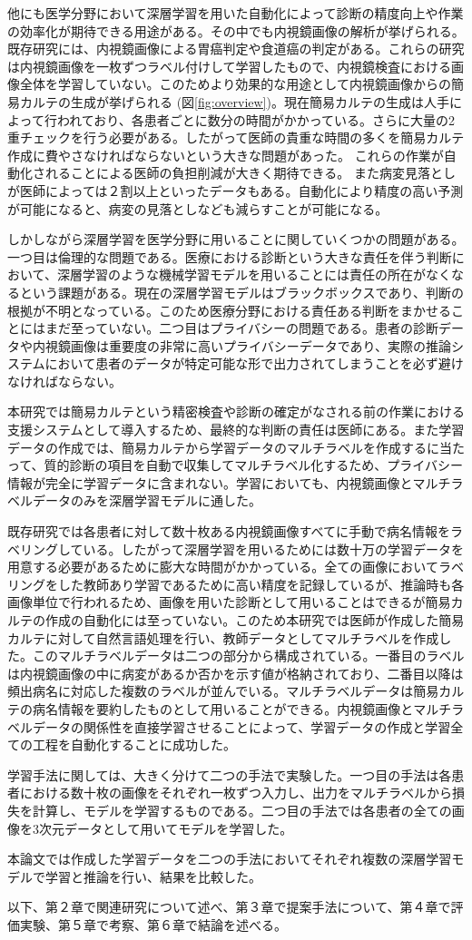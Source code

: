 他にも医学分野において深層学習を用いた自動化によって診断の精度向上や作業の効率化が期待できる用途がある。その中でも内視鏡画像の解析が挙げられる。既存研究には、内視鏡画像による胃癌判定\cite{stomach_cancer}や食道癌\cite{esophageal_cancer}の判定がある。これらの研究は内視鏡画像を一枚ずつラベル付けして学習したもので、内視鏡検査における画像全体を学習していない。このためより効果的な用途として内視鏡画像からの簡易カルテの生成が挙げられる (図\ref{fig:overview})。現在簡易カルテの生成は人手によって行われており、各患者ごとに数分の時間がかかっている。さらに大量の2重チェックを行う必要がある。したがって医師の貴重な時間の多くを簡易カルテ作成に費やさなければならないという大きな問題があった。
これらの作業が自動化されることによる医師の負担削減が大きく期待できる。
また病変見落としが医師によっては２割以上といったデータ\cite{medical_problem2}もある。自動化により精度の高い予測が可能になると、病変の見落としなども減らすことが可能になる。

しかしながら深層学習を医学分野に用いることに関していくつかの問題がある。一つ目は倫理的な問題である。医療における診断という大きな責任を伴う判断において、深層学習のような機械学習モデルを用いることには責任の所在がなくなるという課題がある。現在の深層学習モデルはブラックボックスであり、判断の根拠が不明となっている。このため医療分野における責任ある判断をまかせることにはまだ至っていない。二つ目はプライバシーの問題である。患者の診断データや内視鏡画像は重要度の非常に高いプライバシーデータであり、実際の推論システムにおいて患者のデータが特定可能な形で出力されてしまうことを必ず避けなければならない。

本研究では簡易カルテという精密検査や診断の確定がなされる前の作業における支援システムとして導入するため、最終的な判断の責任は医師にある。また学習データの作成では、簡易カルテから学習データのマルチラベルを作成するに当たって、質的診断の項目を自動で収集してマルチラベル化するため、プライバシー情報が完全に学習データに含まれない。学習においても、内視鏡画像とマルチラベルデータのみを深層学習モデルに通した。

既存研究では各患者に対して数十枚ある内視鏡画像すべてに手動で病名情報をラベリングしている。したがって深層学習を用いるためには数十万の学習データを用意する必要があるために膨大な時間がかかっている。全ての画像においてラベリングをした教師あり学習であるために高い精度を記録しているが、推論時も各画像単位で行われるため、画像を用いた診断として用いることはできるが簡易カルテの作成の自動化には至っていない。このため本研究では医師が作成した簡易カルテに対して自然言語処理を行い、教師データとしてマルチラベルを作成した。このマルチラベルデータは二つの部分から構成されている。一番目のラベルは内視鏡画像の中に病変があるか否かを示す値が格納されており、二番目以降は頻出病名に対応した複数のラベルが並んでいる。マルチラベルデータは簡易カルテの病名情報を要約したものとして用いることができる。内視鏡画像とマルチラベルデータの関係性を直接学習させることによって、学習データの作成と学習全ての工程を自動化することに成功した。

学習手法に関しては、大きく分けて二つの手法で実験した。一つ目の手法は各患者における数十枚の画像をそれぞれ一枚ずつ入力し、出力をマルチラベルから損失を計算し、モデルを学習するものである。二つ目の手法では各患者の全ての画像を3次元データとして用いてモデルを学習した。

本論文では作成した学習データを二つの手法においてそれぞれ複数の深層学習モデルで学習と推論を行い、結果を比較した。

以下、第２章で関連研究について述べ、第３章で提案手法について、第４章で評価実験、第５章で考察、第６章で結論を述べる。
